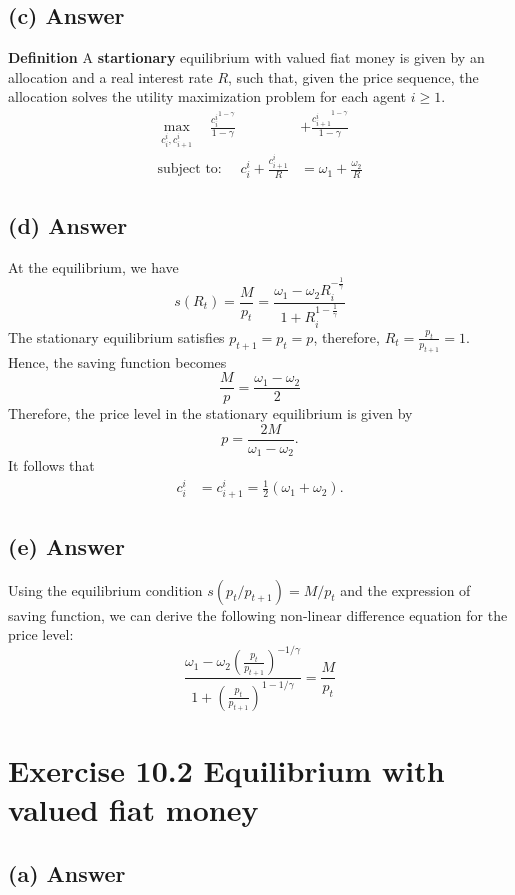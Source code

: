 \documentclass[11pt]{article}
\theoremstyle{definition}
\theoremstyle{boldtitle} %
\numberwithin{equation}{section}
\numberwithin{figure}{section}
\numberwithin{table}{section}
\begin{document}
\subsection{(c) Answer}
\textbf{Definition}
A \textbf{startionary} equilibrium with valued fiat money is given by an allocation and a real interest rate $R$,
such that, 
given the price sequence, the allocation solves the utility maximization problem for each agent $i \geq 1$.
\begin{align*}
    \max_{c_i^i, c_{i+1}^i} \quad \frac{{c^i_i}^{1-\gamma}}{1 - \gamma} & + \frac{{c^i_{i+1}}^{1-\gamma}}{1 - \gamma} \\ 
    \text{subject to: } \quad c_i^i + \frac{c_{i+1}^i }{R} & = \omega_1 + \frac{\omega_2 }{R} 
\end{align*}


\subsection{(d) Answer}
At the equilibrium, we have 
\[
s(R_t) = \frac{M}{p_t} = \frac{\omega_1 - \omega_2 R_i^{-\frac{1}{\gamma}}}{1 + R_i^{1 - \frac{1}{\gamma}}}
\]
The stationary equilibrium satisfies $p_{t+1} =p_t = p$, therefore, 
$R_t = \frac{p_t}{p_{t+1}} = 1$. 
Hence, 
the saving function becomes
\[
 \frac{M}{p} = \frac{\omega_1 - \omega_2}{2}
\]
Therefore, the price level in the stationary equilibrium is given by 
\[
p = \frac{2M}{\omega_1 - \omega_2}.
\]
It follows that 
\begin{align*}
    c_i^i & = c^i_{i+1} = \frac{1}{2} \left(\omega_1 + \omega_2 \right).
\end{align*}


\subsection{(e) Answer}
Using the equilibrium condition $s(p_t/p_{t+1}) = M/p_t$ and the expression of saving function, 
we can derive the following non-linear difference equation for the price level:
\[
\frac{\omega_1 - \omega_2 \left(\frac{p_{t}}{p_{t+1}}\right)^{- 1/\gamma}}{1 + \left(\frac{p_{t}}{p_{t+1}}\right)^{1 - 1/\gamma}} = \frac{M}{p_t} 
\]

\section{Exercise 10.2 Equilibrium with valued fiat money}
\subsection{(a) Answer} 
\end{document}
